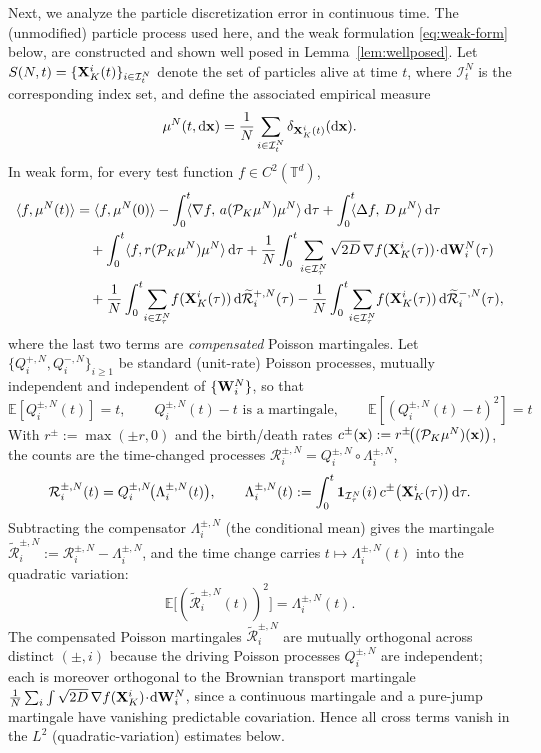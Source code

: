 \documentclass[a4paper,fleqn]{cas-sc}
\theoremstyle{definition}
\theoremstyle{remark}
\begin{document}
Next, we analyze the particle discretization error in continuous time. The (unmodified) particle
process used here, and the weak formulation \eqref{eq:weak-form} below, are
constructed and shown well posed in Lemma~\ref{lem:wellposed}.
Let $S(N,t)=\{\mathbf{X}^i_K(t)\}_{i\in\mathcal I^N_t}$ denote the set of particles
alive at time $t$, where $\mathcal I^N_t$ is the corresponding index set, and
define the associated empirical measure
\[
  \mu^N(t,\mathrm{d}\mathbf{x})
  = \frac{1}{N}\sum_{i\in\mathcal I^N_t}\delta_{\mathbf{X}^i_K(t)}(\mathrm{d}\mathbf{x}).
\]
In weak form, for every test function $f\in C^2(\mathbb T^d)$,
 \begin{equation}\label{eq:weak-form}
     \begin{aligned}
\langle f, \mu^N(t)\rangle
&= \langle f, \mu^N(0)\rangle
 - \int_0^t
   \!\!\langle\nabla f,\,a(\mathcal P_K\mu^N)\mu^N\rangle\,\intd\tau
 + \int_0^t
   \!\!\langle\Delta f,\,D\,\mu^N\rangle\,\intd\tau \\
&\quad + \int_0^t \langle f, r(\mathcal P_K \mu^N)\mu^N\rangle\,\intd\tau 
 + \frac{1}{N}\int_0^t\sum_{i\in\mathcal I^N_\tau}
   \sqrt{2D}\,\nabla f(\bX^i_K(\tau))\!\cdot\! \intd \bW^N_i(\tau)\\
 &\quad + \frac{1}{N}\int_0^t\!\sum_{i\in\mathcal I^N_\tau}\!
   f(\bX^i_K(\tau))\, \intd \widetilde{\mathcal R}^{+,N}_i(\tau)
 - \frac{1}{N}\int_0^t\!\sum_{i\in\mathcal I^N_\tau}\!
   f(\bX^i_K(\tau))\, \intd \widetilde{\mathcal R}^{-,N}_i(\tau),
\end{aligned}
 \end{equation}
where the last two terms are \emph{compensated} Poisson martingales. Let
$\{Q^{+,N}_i,Q^{-,N}_i\}_{i\ge1}$ be standard (unit-rate) Poisson processes,
mutually independent and independent of $\{\mathbf{W}^N_i\}$, so that
\[
\mathbb E[Q^{\pm,N}_i(t)]=t,\qquad
Q^{\pm,N}_i(t)-t \text{ is a martingale},\qquad
\mathbb E[(Q^{\pm,N}_i(t)-t)^2]=t
\]
With $r^\pm:=\max(\pm r,0)$ and the birth/death rates
$c^\pm(\mathbf{x}):=r^\pm\!\bigl((\mathcal P_K\mu^N)(\mathbf{x})\bigr)$, the counts are the
time-changed processes $\mathcal R^{\pm,N}_i=Q^{\pm,N}_i\!\circ\Lambda^{\pm,N}_i$,
\[
\mathcal R^{\pm,N}_i(t)=Q^{\pm,N}_i\!\bigl(\Lambda^{\pm,N}_i(t)\bigr),
\qquad
\Lambda^{\pm,N}_i(t):=\int_0^t \mathbf 1_{\mathcal I^N_\tau}(i)\,
   c^\pm\bigl(\mathbf{X}^i_K(\tau)\bigr)\,\mathrm{d}\tau .
\]
Subtracting the compensator $\Lambda^{\pm,N}_i$ (the conditional mean) gives the
martingale $\widetilde{\mathcal R}^{\pm,N}_i:=\mathcal R^{\pm,N}_i-\Lambda^{\pm,N}_i$,
and the time change carries $t\mapsto\Lambda^{\pm,N}_i(t)$ into the quadratic
variation:
\begin{equation}\label{eq:R-qv}
\mathbb E\bigl[(\widetilde{\mathcal R}^{\pm,N}_i(t))^2\bigr]
=\Lambda^{\pm,N}_i(t).
\end{equation}
The compensated Poisson martingales $\widetilde{\mathcal R}^{\pm,N}_i$ are mutually
orthogonal across distinct $(\pm,i)$ because the driving Poisson processes
$Q^{\pm,N}_i$ are independent; each is moreover orthogonal to the Brownian transport
martingale $\frac1N\sum_i\int\sqrt{2D}\,\nabla f(\mathbf{X}^i_K)\!\cdot\!\mathrm{d}\mathbf{W}^N_i$, since a
continuous martingale and a pure-jump martingale have vanishing predictable
covariation. Hence all cross terms vanish in the $L^2$ (quadratic-variation)
estimates below.
\end{document}
